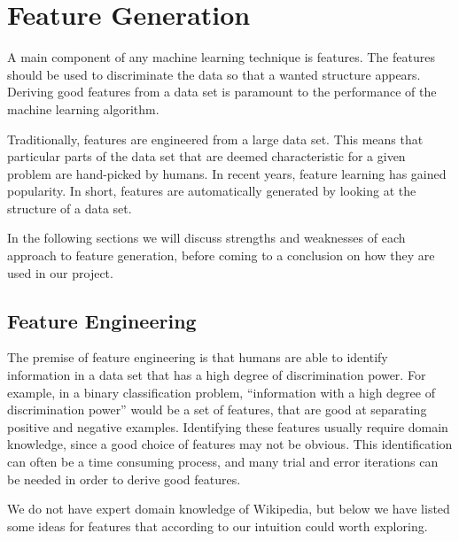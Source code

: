 \section{Feature Generation}\label{sec:feature_generation}
A main component of any machine learning technique is features. The features should be used to discriminate the data so that a wanted structure appears. Deriving good features from a data set is paramount to the performance of the machine learning algorithm.

Traditionally, features are engineered from a large data set. This means that particular parts of the data set that are deemed characteristic for a given problem are hand-picked by humans. In recent years, feature learning has gained popularity. In short, features are automatically generated by looking at the structure of a data set.

In the following sections we will discuss strengths and weaknesses of each approach to feature generation, before coming to a conclusion on how they are used in our project.

\subsection{Feature Engineering}
The premise of feature engineering is that humans are able to identify information in a data set that has a high degree of discrimination power. For example, in a binary classification problem, \enquote{information with a high degree of discrimination power} would be a set of features, that are good at separating positive and negative examples. Identifying these features usually require domain knowledge, since a good choice of features may not be obvious. This identification can often be a time consuming process, and many trial and error iterations can be needed in order to derive good features.

We do not have expert domain knowledge of Wikipedia, but below we have listed some ideas for features that according to our intuition could worth exploring.

